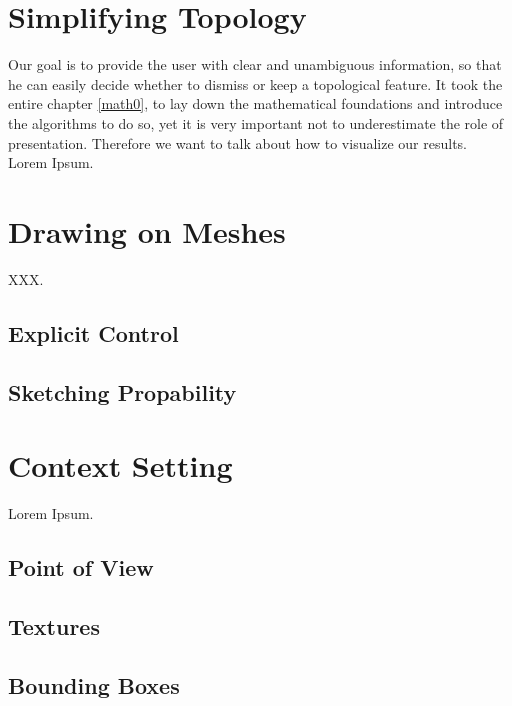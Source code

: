 \section{Simplifying Topology}
\label{topstoc2}

Our goal is to provide the user with clear and unambiguous information, so that he can easily decide whether to dismiss or keep a topological feature.
It took the entire chapter \ref{math0}, to lay down the mathematical foundations and introduce the algorithms to do so, yet it is very important not to underestimate the role of presentation.
Therefore we want to talk about how to visualize our results.\\
Lorem Ipsum.


\section{Drawing on Meshes}
\label{topstoc3}

XXX.

\subsection{Explicit Control}
\label{topstoc31}

\subsection{Sketching Propability}
\label{topstoc32}


\section{Context Setting}
\label{topstoc4}

Lorem Ipsum.

\subsection{Point of View}
\label{topstoc41}

\subsection{Textures}
\label{topstoc42}

\subsection{Bounding Boxes}
\label{topstoc43}

